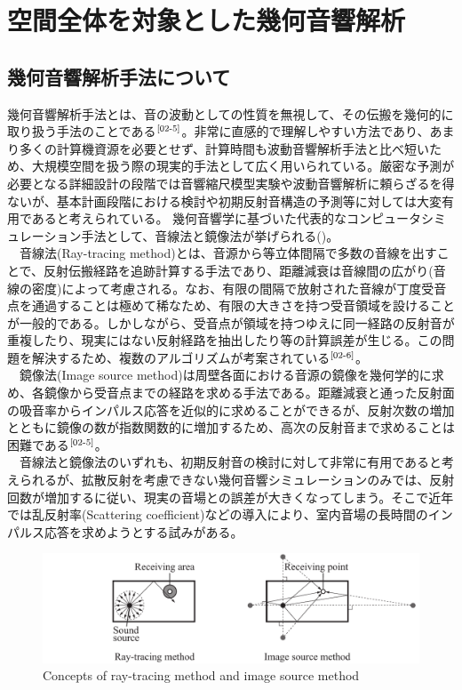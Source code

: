 \chapter{空間全体を対象とした幾何音響解析}

\section{幾何音響解析手法について}
幾何音響解析手法とは、音の波動としての性質を無視して、その伝搬を幾何的に取り扱う手法のことである$^{\text{\cite{02-5}}}$。非常に直感的で理解しやすい方法であり、あまり多くの計算機資源を必要とせず、計算時間も波動音響解析手法と比べ短いため、大規模空間を扱う際の現実的手法として広く用いられている。厳密な予測が必要となる詳細設計の段階では音響縮尺模型実験や波動音響解析に頼らざるを得ないが、基本計画段階における検討や初期反射音構造の予測等に対しては大変有用であると考えられている。
幾何音響学に基づいた代表的なコンピュータシミュレーション手法として、音線法と鏡像法が挙げられる()。
\\　音線法(Ray-tracing method)とは、音源から等立体間隔で多数の音線を出すことで、反射伝搬経路を追跡計算する手法であり、距離減衰は音線間の広がり(音線の密度)によって考慮される。なお、有限の間隔で放射された音線が丁度受音点を通過することは極めて稀なため、有限の大きさを持つ受音領域を設けることが一般的である。しかしながら、受音点が領域を持つゆえに同一経路の反射音が重複したり、現実にはない反射経路を抽出したり等の計算誤差が生じる。この問題を解決するため、複数のアルゴリズムが考案されている$^{\text{\cite{02-6}}}$。
\\　鏡像法(Image source method)は周壁各面における音源の鏡像を幾何学的に求め、各鏡像から受音点までの経路を求める手法である。距離減衰と通った反射面の吸音率からインパルス応答を近似的に求めることができるが、反射次数の増加とともに鏡像の数が指数関数的に増加するため、高次の反射音まで求めることは困難である$^{\text{\cite{02-5}}}$。
\\　音線法と鏡像法のいずれも、初期反射音の検討に対して非常に有用であると考えられるが、拡散反射を考慮できない幾何音響シミュレーションのみでは、反射回数が増加するに従い、現実の音場との誤差が大きくなってしまう。そこで近年では乱反射率(Scattering coefficient)などの導入により、室内音場の長時間のインパルス応答を求めようとする試みがある。
\begin{figure}[H]
    \centering
    \includegraphics[keepaspectratio,scale=0.65]{02_att/kikaonkyo.pdf}
    \caption{\hspace{1mm}Concepts of ray-tracing method and image source method}
    \label{fig:音線法と鏡像法}
\end{figure}

